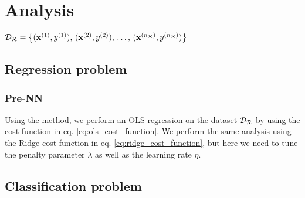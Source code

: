 \section{Analysis}\label{sec:analysis}


$\mathcal{D}_\mathcal{R} = \big\{ (\mathbf{x}^{(1)}, y^{(1)}), \,  (\mathbf{x}^{(2)}, y^{(2)}), \,\dots, \, (\mathbf{x}^{({n_\mathcal{R}})}, y^{(n_\mathcal{R})}) \big\}$ 


\subsection{Regression problem}\label{sec:analysis_regression}

    \subsubsection{Pre-NN}\label{sec:analysis_regressoin_preNN}

    Using the  method, we perform an OLS regression on the dataset $\mathcal{D}_\mathcal{R}$ by using the cost function in eq. \eqref{eq:ols_cost_function}. We perform the same analysis using the Ridge cost function in eq. \eqref{eq:ridge_cost_function}, but here we need to tune the penalty parameter $\lambda$ as well as the learning rate $\eta$.




\subsection{Classification problem}\label{sec:analysis_classification}

